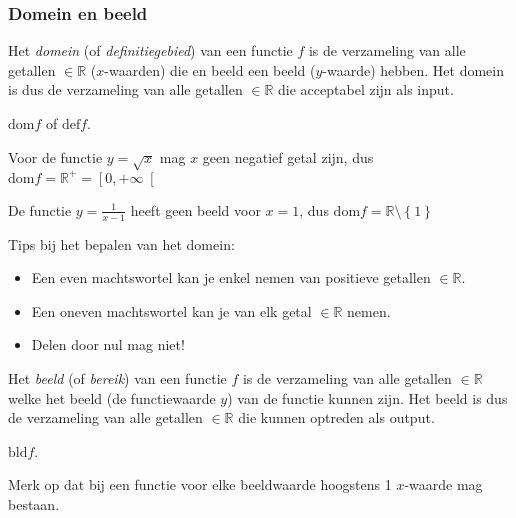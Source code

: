 \subsubsection{Domein en beeld}


\begin{definitie}
	Het \emph{domein} (of \emph{definitiegebied}) van een functie
$f$ is de verzameling van alle getallen $\in \mathbb{R}$ ($x$-waarden) die en beeld
een beeld ($y$-waarde) hebben. Het domein is dus de
verzameling van alle getallen $\in \mathbb{R}$ die acceptabel zijn als input.
\end{definitie}
\begin{notatie}
$\textrm{dom}f$ of $\textrm{def}f$.
\end{notatie}



\begin{voorbeeld}
	Voor de functie $y=\sqrt{x}$ mag $x$ geen
negatief getal zijn, dus $\textrm{dom}f=\mathbb{R}^{+}=\left[0,+\infty\right[$
\end{voorbeeld}

\begin{voorbeeld}
	De functie $y=\frac{1}{x-1}$ heeft geen beeld
voor $x=1$, dus $\textrm{dom}f=\mathbb{R}\setminus\left\{ 1\right\} $

\end{voorbeeld}

Tips bij het bepalen van het domein:
\begin{itemize}
\item Een even machtswortel kan je enkel nemen van positieve getallen $\in \mathbb{R}$.
\item Een oneven machtswortel kan je van elk getal $\in \mathbb{R}$ nemen.
\item Delen door nul mag niet!
\end{itemize}

\begin{definitie}
	Het \emph{beeld} (of \emph{bereik}) van een functie $f$
is de verzameling van alle getallen $\in \mathbb{R}$ welke het beeld (de functiewaarde
$y$) van de functie kunnen zijn. Het beeld is dus de verzameling
van alle getallen $\in \mathbb{R}$ die kunnen optreden als output. 
\end{definitie}

\begin{notatie}
$\textrm{bld}f$.
\end{notatie}

Merk op dat bij een functie voor elke beeldwaarde hoogstens 1 $x$-waarde mag bestaan.

